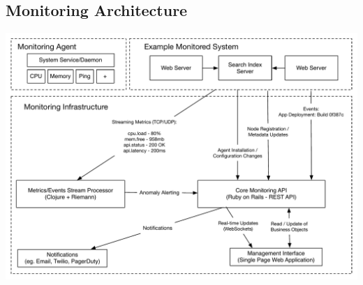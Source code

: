 \documentclass{cshonours}
\begin{document}
\begin{landscape}
  \subsection{Monitoring Architecture}
  \includegraphics[scale=0.7]{architecture.pdf}
\end{landscape}


\printbibliography[title=References]
% 
\end{document}

